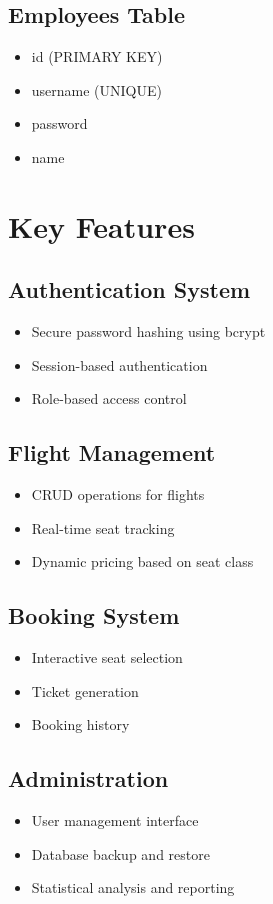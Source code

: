 \documentclass{article}
\begin{document}
\subsection{Employees Table}
\begin{itemize}
    \item id (PRIMARY KEY)
    \item username (UNIQUE)
    \item password
    \item name
\end{itemize}

\section{Key Features}

\subsection{Authentication System}
\begin{itemize}
    \item Secure password hashing using bcrypt
    \item Session-based authentication
    \item Role-based access control
\end{itemize}

\subsection{Flight Management}
\begin{itemize}
    \item CRUD operations for flights
    \item Real-time seat tracking
    \item Dynamic pricing based on seat class
\end{itemize}

\subsection{Booking System}
\begin{itemize}
    \item Interactive seat selection
    \item Ticket generation
    \item Booking history
\end{itemize}

\subsection{Administration}
\begin{itemize}
    \item User management interface
    \item Database backup and restore
    \item Statistical analysis and reporting
\end{itemize}
\end{document}
